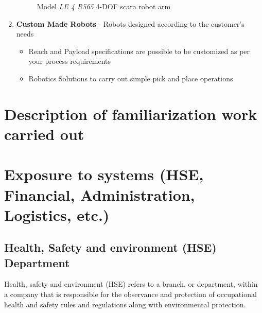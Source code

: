\documentclass[a4paper,12pt]{report}%
\begin{document}
\begin{enumerate}
	\begin{figure}[H]
		\centering
		\caption{Model \textit{LE 4 R565} 4-DOF \ac{scara} robot arm\cite{scara_robots}}
		\label{fig:fourdofrobot}
	\end{figure}
	
	
	
	\item \textbf{Custom Made Robots} - Robots designed according to the customer's needs
	\begin{itemize}
		\item Reach and Payload specifications are possible to be customized as per your process requirements
		\item Robotics Solutions to carry out simple pick and place operations
	\end{itemize}
\end{enumerate}





\chapter{Description of familiarization work carried out}
\chapter{Exposure to systems (HSE, Financial, Administration, Logistics, etc.)}

\section{Health, Safety and environment (HSE) Department}

Health, safety and environment (HSE) refers to a branch, or department, within a company that is responsible for the observance and protection of occupational health and safety rules and regulations along with environmental protection.
\end{document}
